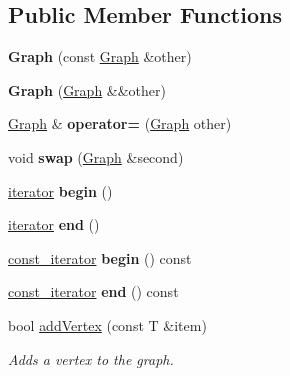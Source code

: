 \subsection*{Public Member Functions}
\begin{DoxyCompactItemize}
\item 
\mbox{\label{class_graph_a39aa3fc244acb59caab8ead87a490b08}} 
{\bfseries Graph} (const \hyperlink{class_graph}{Graph} \&other)
\item 
\mbox{\label{class_graph_adcc98abcaffd854bae4473287c0ec185}} 
{\bfseries Graph} (\hyperlink{class_graph}{Graph} \&\&other)
\item 
\mbox{\label{class_graph_a36fc23acaf0e5e89d9f7f54144b3f8c0}} 
\hyperlink{class_graph}{Graph} \& {\bfseries operator=} (\hyperlink{class_graph}{Graph} other)
\item 
\mbox{\label{class_graph_a427b02545efdf010462925ad5ff05726}} 
void {\bfseries swap} (\hyperlink{class_graph}{Graph} \&second)
\item 
\mbox{\label{class_graph_ae249d5954c95e0b313d53ffe38963b54}} 
\hyperlink{class_graph_1_1_iterator}{iterator} {\bfseries begin} ()
\item 
\mbox{\label{class_graph_a46a1f0ef6b81885b6bf40ad9cf527a94}} 
\hyperlink{class_graph_1_1_iterator}{iterator} {\bfseries end} ()
\item 
\mbox{\label{class_graph_a3a735dd82d4a50de2aa8f07f84efa593}} 
\hyperlink{class_graph_1_1_iterator}{const\+\_\+iterator} {\bfseries begin} () const
\item 
\mbox{\label{class_graph_a3ad7d926d0085be10f901e0ba4c98ddd}} 
\hyperlink{class_graph_1_1_iterator}{const\+\_\+iterator} {\bfseries end} () const
\item 
bool \hyperlink{class_graph_a0d9a2a945cb00f2600f26ad63a4828d6}{add\+Vertex} (const T \&item)
\begin{DoxyCompactList}\small\item\em Adds a vertex to the graph. \end{DoxyCompactList}\item 
\mbox{\label{class_graph_ac65b5e08820fafb280c55bdce732f19a}} 

\end{DoxyCompactItemize}

